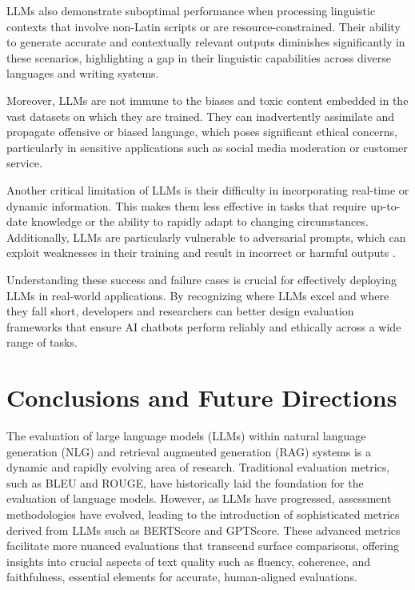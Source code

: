 LLMs also demonstrate suboptimal performance when processing linguistic contexts that involve non-Latin scripts or are resource-constrained. Their ability to generate accurate and contextually relevant outputs diminishes significantly in these scenarios, highlighting a gap in their linguistic capabilities across diverse languages and writing systems.

Moreover, LLMs are not immune to the biases and toxic content embedded in the vast datasets on which they are trained. They can inadvertently assimilate and propagate offensive or biased language, which poses significant ethical concerns, particularly in sensitive applications such as social media moderation or customer service.

Another critical limitation of LLMs is their difficulty in incorporating real-time or dynamic information. This makes them less effective in tasks that require up-to-date knowledge or the ability to rapidly adapt to changing circumstances. Additionally, LLMs are particularly vulnerable to adversarial prompts, which can exploit weaknesses in their training and result in incorrect or harmful outputs \cite{chang2024survey}.

Understanding these success and failure cases is crucial for effectively deploying LLMs in real-world applications. By recognizing where LLMs excel and where they fall short, developers and researchers can better design evaluation frameworks that ensure AI chatbots perform reliably and ethically across a wide range of tasks.

\section{Conclusions and Future Directions}

The evaluation of large language models (LLMs) within natural language generation (NLG) and retrieval augmented generation (RAG) systems is a dynamic and rapidly evolving area of research. Traditional evaluation metrics, such as BLEU and ROUGE, have historically laid the foundation for the evaluation of language models. However, as LLMs have progressed, assessment methodologies have evolved, leading to the introduction of sophisticated metrics derived from LLMs such as BERTScore and GPTScore. These advanced metrics facilitate more nuanced evaluations that transcend surface comparisons, offering insights into crucial aspects of text quality such as fluency, coherence, and faithfulness, essential elements for accurate, human-aligned evaluations.

